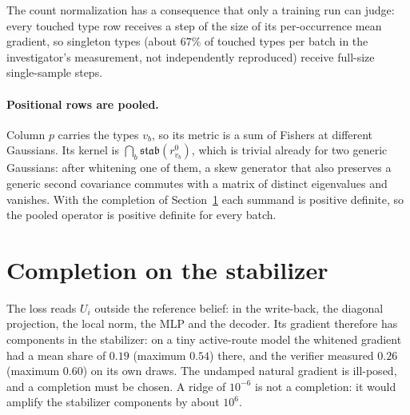 \documentclass[11pt]{article}
\theoremstyle{definition}
\theoremstyle{remark}
\newcommand{\stab}{\mathfrak{stab}}
\begin{document}
The count normalization has a consequence that only a training run can judge: every touched type row receives a step of the size of its per-occurrence mean gradient, so singleton types (about $67\%$ of touched types per batch in the investigator's measurement, not independently reproduced) receive full-size single-sample steps.

\paragraph{Positional rows are pooled.} Column $p$ carries the types $v_b$, so its metric is a sum of Fishers at different Gaussians. Its kernel is $\bigcap_b\stab(r^0_{v_b})$, which is trivial already for two generic Gaussians: after whitening one of them, a skew generator that also preserves a generic second covariance commutes with a matrix of distinct eigenvalues and vanishes. With the completion of Section~\ref{sec:completion} each summand is positive definite, so the pooled operator is positive definite for every batch.

\section{Completion on the stabilizer}\label{sec:completion}

The loss reads $U_i$ outside the reference belief: in the write-back, the diagonal projection, the local norm, the MLP and the decoder. Its gradient therefore has components in the stabilizer: on a tiny active-route model the whitened gradient had a mean share of $0.19$ (maximum $0.54$) there, and the verifier measured $0.26$ (maximum $0.60$) on its own draws. The undamped natural gradient is ill-posed, and a completion must be chosen. A ridge of $10^{-6}$ is not a completion: it would amplify the stabilizer components by about $10^6$.
\end{document}
